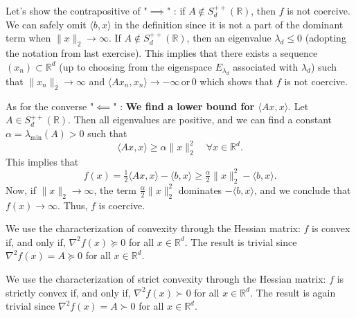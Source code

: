 \begin{answer}
    \rpos 
    \begin{answerenum}
        \item Let's show the contrapositive of "\(\implies\)" : if \(A \notin S_{d}^{++}(\mathbb{R})\), then \(f\) is not coercive.
            We can safely omit \(\langle b, x \rangle\) in the definition since it is not a part of the dominant term when \(\|x\|_2 \to \infty\).  
            If \(A \notin S_{d}^{++}(\mathbb{R})\), then an eigenvalue \(\lambda_d \leq 0\) (adopting the notation from last exercise). 
            This implies that there exists a sequence \((x_n) \subset \mathbb{R}^d\) (up to choosing from the eigenspace \(E_{\lambda_d}\) associated with \(\lambda_d\)) 
            such that \(\|x_n\|_2 \to \infty\) and \(\langle Ax_n, x_n \rangle \to -\infty \, \text{or} \, 0\) which shows that \(f\) is not coercive.

            As for the converse "\(\impliedby\)" : \textbf{We find a lower bound for \(\langle Ax, x \rangle\)}.
            Let \(A \in S_{d}^{++}(\mathbb{R})\). Then all eigenvalues are positive, and we can find a constant \(\alpha = \lambda_{\min}(A) > 0\)  such that
            \[
            \langle Ax, x \rangle \geq \alpha \|x\|_2^2 \quad \forall x \in \mathbb{R}^d.
            \]
            This implies that
            \[
            f(x) = \tfrac{1}{2}\langle Ax, x\rangle - \langle b, x\rangle \geq \tfrac{\alpha}{2} \|x\|_2^2 - \langle b, x\rangle.
            \]
            Now, if \(\|x\|_2 \to \infty\), the term \(\tfrac{\alpha}{2} \|x\|_2^2\) dominates \(-\langle b, x\rangle\), and we conclude that \(f(x) \to \infty\). Thus, \(f\) is coercive.
        \item We use the characterization of convexity through the Hessian matrix: \(f\) is convex if, and only if, \(\nabla^2 f(x) \succeq 0\) for all \(x \in \mathbb{R}^d\). 
            The result is trivial since \(\nabla^2 f(x) = A \succeq 0\) for all \(x \in \mathbb{R}^d\).
        \item We use the characterization of strict convexity through the Hessian matrix: \(f\) is strictly convex if, and only if, \(\nabla^2 f(x) \succ 0\) for all \(x \in \mathbb{R}^d\).
            The result is again trivial since \(\nabla^2 f(x) = A \succ 0\) for all \(x \in \mathbb{R}^d\).
    \end{answerenum}
\end{answer}